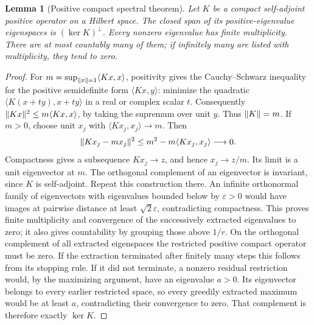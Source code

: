 \documentclass[11pt,oneside]{book}
\newtheorem{lemma}[theorem]{Lemma}
\theoremstyle{definition}
\theoremstyle{remark}\newtheorem{remark}[theorem]{Remark}
\begin{document}
\begin{lemma}[Positive compact spectral theorem]\label{d13:10:compact-spectral}
Let \(K\) be a compact self-adjoint positive operator on a Hilbert space.
The closed span of its positive-eigenvalue eigenspaces is
\((\ker K)^\perp\). Every nonzero eigenvalue has finite multiplicity.
There are at most countably many of them; if infinitely many are listed
with multiplicity, they tend to zero.
\end{lemma}
\begin{proof}
For \(m=\sup_{\lVert x\rVert=1}\langle Kx,x\rangle\), positivity gives the
Cauchy--Schwarz inequality for the positive semidefinite form
\(\langle Kx,y\rangle\): minimize the quadratic
\(\langle K(x+ty),x+ty\rangle\) in a real or complex scalar \(t\).
Consequently
\(\lVert Kx\rVert^2\le m\langle Kx,x\rangle\), by taking the supremum over
unit \(y\). Thus \(\lVert K\rVert=m\).
If \(m>0\), choose unit \(x_j\) with
\(\langle Kx_j,x_j\rangle\to m\). Then
\[
 \lVert Kx_j-mx_j\rVert^2
 \le m^2-m\langle Kx_j,x_j\rangle\longrightarrow0.
\]
Compactness gives a subsequence \(Kx_j\to z\), and hence
\(x_j\to z/m\). Its limit is a unit eigenvector at \(m\).
The orthogonal complement of an eigenvector is invariant, since \(K\)
is self-adjoint. Repeat this construction there. An infinite orthonormal
family of eigenvectors with eigenvalues bounded below by
\(\varepsilon>0\) would have images at pairwise distance at least
\(\sqrt2\varepsilon\), contradicting compactness. This proves finite
multiplicity and convergence of the successively extracted eigenvalues
to zero; it also gives countability by grouping those above \(1/r\).
On the orthogonal complement of all extracted eigenspaces the restricted
positive compact operator must be zero. If the extraction terminated
after finitely many steps this follows from its stopping rule.
If it did not terminate, a nonzero residual restriction would, by the
maximizing argument, have an eigenvalue \(a>0\). Its eigenvector belongs
to every earlier restricted space, so every greedily extracted maximum
would be at least \(a\), contradicting their convergence to zero.
That complement is therefore exactly \(\ker K\).
\end{proof}
\end{document}
